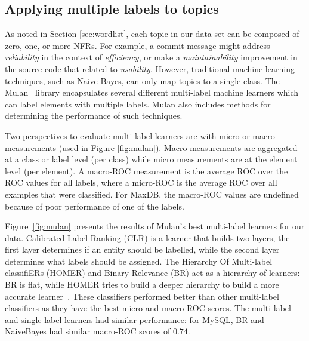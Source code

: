\documentclass[]{sig-alternate}
\begin{document}
\subsection{Applying multiple labels to topics}
\label{sec:multilabel}

As noted in Section \ref{sec:wordlist}, each topic in our data-set can be composed of zero, one, or more NFRs. 
For example, a commit message might address \textit{reliability} in the context of \textit{efficiency}, or make a \textit{maintainability} improvement in the source code that related to \textit{usability}. 
However, traditional machine learning techniques, such as Naive Bayes, can only map topics to a single class. 
The Mulan~\cite{mulan} library encapsulates several different multi-label machine learners which can label elements with multiple labels.
Mulan also includes methods for determining the performance of such techniques.


Two perspectives to evaluate multi-label learners are with micro or macro measurements (used in Figure \ref{fig:mulan}).
Macro measurements are aggregated at a class or label level (per class) while micro measurements are at the element level (per element).
A macro-ROC measurement is the average ROC over the ROC values for all labels, where a micro-ROC is the average ROC over all examples that were classified. 
For MaxDB, the macro-ROC values are undefined because of poor performance of one of the labels.%

Figure~\ref{fig:mulan} presents the results of Mulan's best multi-label learners for our data. 
Calibrated Label Ranking (CLR) is a learner that builds two layers, the first layer determines if an entity should be labelled, while the second layer determines what labels should be assigned.
The Hierarchy Of Multi-label classifiERs (HOMER) and Binary Relevance (BR) act as a hierarchy of learners: BR is flat, while HOMER tries to build a deeper hierarchy to build a more accurate learner~\cite{mulan}. 
These classifiers performed better than other multi-label classifiers as they have the best micro and macro ROC scores. 
The multi-label and single-label learners had similar performance: for MySQL, BR and NaiveBayes had similar macro-ROC scores of $0.74$.
\end{document}
